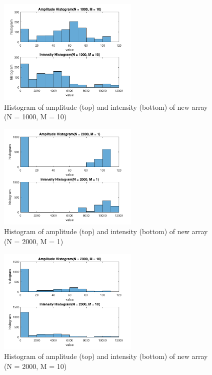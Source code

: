 \documentclass{article}
\begin{document}
\begin{figure}[H]
	\centering
	\includegraphics[width = 0.6\textwidth]{src/2pi/hist_1000_10.pdf}
	\caption{Histogram of amplitude (top) and intensity (bottom) of new array (N = 1000, M = 10)}
	\label{fig:hist-1000-10}
\end{figure}
\begin{figure}[H]
	\centering
	\includegraphics[width = 0.6\textwidth]{src/2pi/hist_2000_1.pdf}
	\caption{Histogram of amplitude (top) and intensity (bottom) of new array (N = 2000, M = 1)}
	\label{fig:hist-2000-1}
\end{figure}
\begin{figure}[H]
	\centering
	\includegraphics[width = 0.6\textwidth]{src/2pi/hist_2000_10.pdf}
	\caption{Histogram of amplitude (top) and intensity (bottom) of new array (N = 2000, M = 10)}
	\label{fig:hist-2000-10}
\end{figure}
\end{document}
